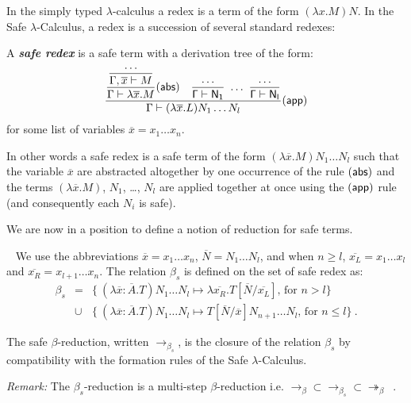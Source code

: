 \documentclass{llncs}
\newcommand\defname[1]{{\bf\em #1}\index{#1}}
\newcommand\betared{\rightarrow_\beta}
\newcommand\betasred{\rightarrow_{\beta_s}}
\newcommand\betaredtr{\twoheadrightarrow_\beta} %
\newcommand\subst[2]{\left[ #1/#2 \right]}
\newcommand\dps{\displaystyle}
\newcommand\rulef[2]{\frac{\dps #1}{#2}}
\begin{document}
In the simply typed $\lambda$-calculus a redex is a term of the form
$(\lambda x . M) N$. In the Safe $\lambda$-Calculus, a redex is a succession of several standard redexes:
\begin{definition}
A \defname{safe redex} is a safe term with a derivation tree of the form:
$$   \rulef{
            \rulef{\rulef{\ldots}{\Gamma, \overline{x}\vdash M}}{\Gamma \vdash \lambda \overline{x} . M} (\sf{abs})
            \quad
            \rulef{\ldots}{\Gamma \vdash N_1}  \ \ldots \  \rulef{\ldots}{\Gamma \vdash N_l}
    }
    {
       \Gamma \vdash (\lambda \overline{x} . L) N_1 \ldots N_l
    } (\sf{app})
$$
for some list of variables $\overline{x}=x_1\ldots x_n$.
\end{definition}

In other words a safe redex is a safe term of the form $(\lambda \overline{x} . M) N_1 \ldots N_l$ such that
the variable $\overline{x}$ are abstracted altogether by one occurrence of the rule $(\sf{abs})$ and the terms $(\lambda \overline{x} . M)$, $N_1$, \ldots, $N_l$ are applied together at once using the $(\sf{app})$ rule
(and consequently each $N_i$ is safe).



We are now in a position to define a notion of reduction for safe terms.

\begin{definition} \
\label{dfn:safereduction} We use the
abbreviations $\overline{x} = x_1 \ldots x_n$,
$\overline{N} = N_1 \ldots N_l$, and when $n\geq l$, $\overline{x_L}
= x_1 \ldots x_l$ and $\overline{x_R} = x_{l+1} \ldots x_n$.
The relation $\beta_s$ is defined on the set of safe redex as:
\begin{eqnarray*}
\beta_s &=&
\{  \ (\lambda \overline{x} : \overline{A} . T) N_1 \ldots N_l \mapsto \lambda \overline{x_R}. T\subst{\overline{N}}{\overline{x_L}} \mbox{, for $n> l$}
\} \\
&\cup&
\{ \ (\lambda \overline{x} : \overline{A} . T) N_1 \ldots N_l \mapsto T\subst{\overline{N}}{\overline{x}} N_{n+1} \ldots N_l
\mbox{, for $n\leq l$} \} \ .
\end{eqnarray*}

The safe $\beta$-reduction, written $\betasred$, is the closure of
the relation $\beta_s$ by compatibility with the formation rules of
the Safe $\lambda$-Calculus.
\end{definition}

\noindent \emph{Remark:} The $\beta_s$-reduction is a multi-step $\beta$-reduction i.e. $\betared \subset \betasred \subset \betaredtr$\ .
\end{document}
